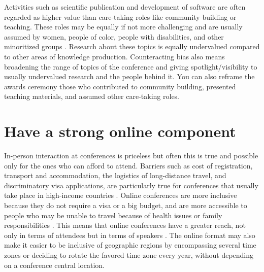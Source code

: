 \documentclass[10pt,letterpaper]{article}
\begin{document}
Activities such as scientific publication and development of software are often regarded as higher value than care-taking roles like community building or teaching. 
These roles may be equally if not more challenging and are usually assumed by women, people of color, people with disabilities, and other minoritized groups \cite{cheng2020x+, burfordHomelinessMeantHaving2020}. Research about these topics is equally undervalued compared to other areas of knowledge production. 
Counteracting bias also means broadening the range of topics of the conference and giving spotlight/visibility to usually undervalued research and the people behind it.
You can also reframe the awards ceremony  those who contributed to community building, presented teaching materials, and assumed other care-taking roles.


\section{Have a strong online component} 
\label{rule_online}

In-person interaction at conferences is priceless but often this is true and possible only for the ones who can afford to attend. 
Barriers such as cost of registration, transport and accommodation, the logistics of long-distance travel, and discriminatory visa applications, are particularly true for conferences that usually take place in high-income countries \cite{arendDisparityConferenceRegistration2019,gewinWhatScientistsShould2019,jooKeepOnlineOption2021}. 
Online conferences are more inclusive because they do not require a visa or a big budget, and are more accessible to people who may be unable to travel because of health issues or family responsibilities \cite{salibaGettingGripsOnline2020}.
This means that online conferences have a greater reach, not only in terms of attendees but in terms of speakers  \cite{atkinsonJournalMedicine20202021, roosOnlineConferencesNew2020, jooKeepOnlineOption2021}.
The online format may also make it easier to be inclusive of geographic regions by encompassing several time zones or deciding to rotate the favored time zone every year, without depending on a conference central location. 
\end{document}
